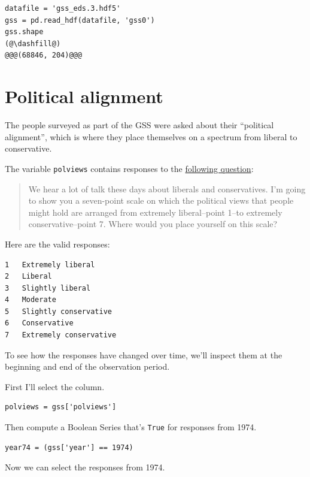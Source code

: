 \begin{lstlisting}[]
datafile = 'gss_eds.3.hdf5'
gss = pd.read_hdf(datafile, 'gss0')
gss.shape
(@\dashfill@)
@@@(68846, 204)@@@
\end{lstlisting}

\hypertarget{political-alignment}{%
\section{Political alignment}\label{political-alignment}}

The people surveyed as part of the GSS were asked about their
``political alignment'', which is where they place themselves on a
spectrum from liberal to conservative.

The variable \passthrough{\lstinline!polviews!} contains responses to
the
\href{https://gssdataexplorer.norc.org/projects/52787/variables/178/vshow}{following
question}:

\begin{quote}
We hear a lot of talk these days about liberals and conservatives. I'm
going to show you a seven-point scale on which the political views that
people might hold are arranged from extremely liberal--point 1--to
extremely conservative--point 7. Where would you place yourself on this
scale?
\end{quote}

Here are the valid responses:

\begin{lstlisting}
1   Extremely liberal
2   Liberal
3   Slightly liberal
4   Moderate
5   Slightly conservative
6   Conservative
7   Extremely conservative
\end{lstlisting}

To see how the responses have changed over time, we'll inspect them at
the beginning and end of the observation period.

First I'll select the column.

\begin{lstlisting}[]
polviews = gss['polviews']
\end{lstlisting}

Then compute a Boolean Series that's \passthrough{\lstinline!True!} for
responses from 1974.

\begin{lstlisting}[]
year74 = (gss['year'] == 1974)
\end{lstlisting}

Now we can select the responses from 1974.

